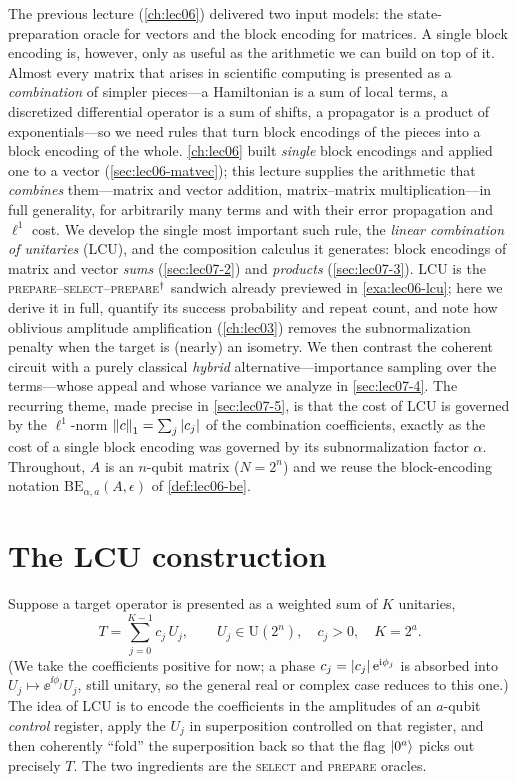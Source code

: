 The previous lecture (\cref{ch:lec06}) delivered two input models: the
state-preparation oracle for vectors and the block encoding for matrices. A
single block encoding is, however, only as useful as the arithmetic we can build
on top of it. Almost every matrix that arises in scientific computing is presented
as a \emph{combination} of simpler pieces---a Hamiltonian is a sum of local terms,
a discretized differential operator is a sum of shifts, a propagator is a product
of exponentials---so we need rules that turn block encodings of the pieces into a
block encoding of the whole. \cref{ch:lec06} built \emph{single} block encodings and
applied one to a vector (\cref{sec:lec06-matvec}); this lecture supplies the arithmetic
that \emph{combines} them---matrix and vector addition, matrix--matrix
multiplication---in full generality, for arbitrarily many terms and with their error
propagation and $\ell^1$ cost. We develop the
single most important such rule, the \emph{linear combination of unitaries} (LCU), and
the composition
calculus it generates: block encodings of matrix and vector \emph{sums}
(\cref{sec:lec07-2}) and \emph{products} (\cref{sec:lec07-3}). LCU is the
\textsc{prepare}--\textsc{select}--\textsc{prepare}$^{\dagger}$ sandwich already
previewed in \cref{exa:lec06-lcu}; here we derive it in full, quantify its success
probability and repeat count, and note how oblivious amplitude amplification
(\cref{ch:lec03}) removes the subnormalization penalty when the target is
(nearly) an isometry. We then contrast the coherent circuit with a purely
classical \emph{hybrid} alternative---importance sampling over the terms---whose
appeal and whose variance we analyze in \cref{sec:lec07-4}. The recurring theme,
made precise in \cref{sec:lec07-5}, is that the cost of LCU is governed by the
$\ell^1$-norm $\left\lVert c \right\rVert_1=\sum_j\left\lvert c_j \right\rvert$ of the combination coefficients, exactly
as the cost of a single block encoding was governed by its subnormalization factor
$\alpha$. Throughout, $A$ is an $n$-qubit matrix ($N=2^n$) and we reuse the
block-encoding notation $\mathrm{BE}_{\alpha,a}(A,\epsilon)$ of
\cref{def:lec06-be}.

\section{The LCU construction}
\label{sec:lec07-1}

Suppose a target operator is presented as a weighted sum of $K$ unitaries,
\begin{equation}
  T=\sum_{j=0}^{K-1}c_j\,U_j,\qquad U_j\in\mathrm{U}(2^n),\quad c_j>0,\quad K=2^a.
  \label{eq:lec07-Tdef}
\end{equation}
(We take the coefficients positive for now; a phase $c_j=\left\lvert c_j \right\rvert\mathrm{e}^{\mathrm{i}\phi_j}$
is absorbed into $U_j\mapsto\ee^{\ii\phi_j}U_j$, still unitary, so the general real
or complex case reduces to this one.) The idea of LCU is to encode the coefficients
in the amplitudes of an $a$-qubit \emph{control} register, apply the $U_j$ in
superposition controlled on that register, and then coherently ``fold'' the
superposition back so that the flag $\ket{0^a}$ picks out precisely $T$. The two
ingredients are the \textsc{select} and \textsc{prepare} oracles.

